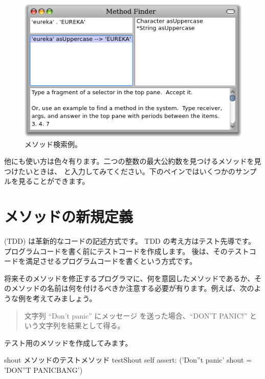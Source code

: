 \documentclass[a4paper,10pt,twoside]{book}
\begin{document}
\begin{figure}[hbt]
\centerline {\includegraphics[width=\textwidth]{MethodFinder-example1}}
\caption{メソッド検索例。
}
\end{figure}

他にも使い方は色々有ります。二つの整数の最大公約数を見つけるメソッドを見つけたいときは、 と入力してみてください。下のペインではいくつかのサンプルを見ることができます。

\section{メソッドの新規定義}

\cite{Beck03a} (TDD) は革新的なコードの記述方式です。
TDD の考え方はテスト先導です。プログラムコードを書く前にテストコードを作成します。
後は、そのテストコードを満足させるプログラムコードを書くという方式です。

将来そのメソッドを修正するプログラマに、何を意図したメソッドであるか、そのメソッドの名前は何を付けるべきか注意する必要が有ります。例えば、次のような例を考えてみましょう。

\begin{quote}
文字列 ``Don't panic'' にメッセージ  を送った場合、``DON'T PANIC!'' という文字列を結果として得る。
\end{quote}

\noindent
テスト用のメソッドを作成してみます。

\begin{method}[testShout]{shout メソッドのテストメソッド}
testShout
	self assert: ('Don''t panic' shout = 'DON''T PANICBANG')
\end{method} %
\end{document}
